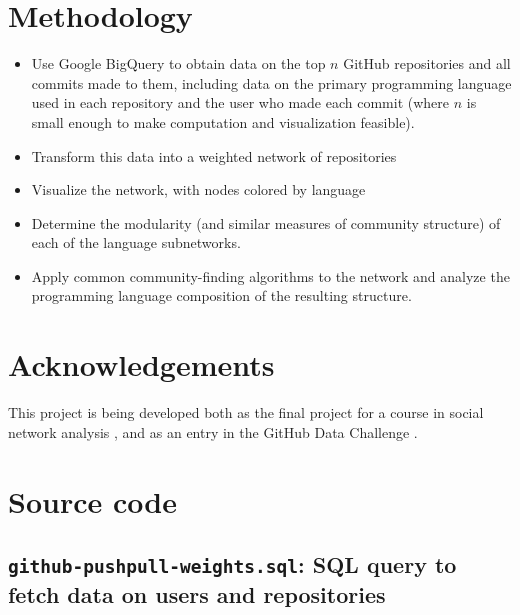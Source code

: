 \documentclass[twocolumn]{article}
\begin{document}
\section{Methodology}
\begin{itemize}
    \item Use Google BigQuery to obtain data on the top $n$ GitHub repositories
        and all commits made to them, including data on the primary programming
        language used in each repository and the user who made each commit
        (where $n$ is small enough to make computation and visualization
        feasible).
    \item Transform this data into a weighted network of repositories
    \item Visualize the network, with nodes colored by language
    \item Determine the modularity (and similar measures of community structure)
        of each of the language subnetworks.
    \item Apply common community-finding algorithms to the network and analyze
        the programming language composition of the resulting structure.
\end{itemize}

\section{Acknowledgements}
This project is being developed both as the final project for a course in social
network analysis \cite{snacourse}, and as an entry in the GitHub Data Challenge
\cite{doll13}.





\onecolumn
\appendix
\section{Source code}
\subsection{\texttt{github-pushpull-weights.sql}: SQL query to fetch data on users and
repositories}

\end{document}
